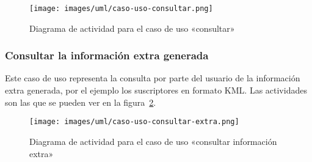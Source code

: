 \begin{figure}[H]
 	\centering
	\texttt{[image: images/uml/caso-uso-consultar.png]}
	\caption{Diagrama de actividad para el caso de uso «consultar»}
	\label{fig:uml:consultar}
\end{figure}

\subsubsection{Consultar la información extra generada}

Este caso de uso representa la consulta por parte del usuario de la 
información extra generada, por el ejemplo los suscriptores en formato 
KML. Las actividades son las que se pueden ver en la 
figura~\ref{fig:uml:consultar-extra}.

\begin{figure}[H]
 	\centering
	\texttt{[image: images/uml/caso-uso-consultar-extra.png]}
	\caption{Diagrama de actividad para el caso de uso «consultar información extra»}
	\label{fig:uml:consultar-extra}
\end{figure}

